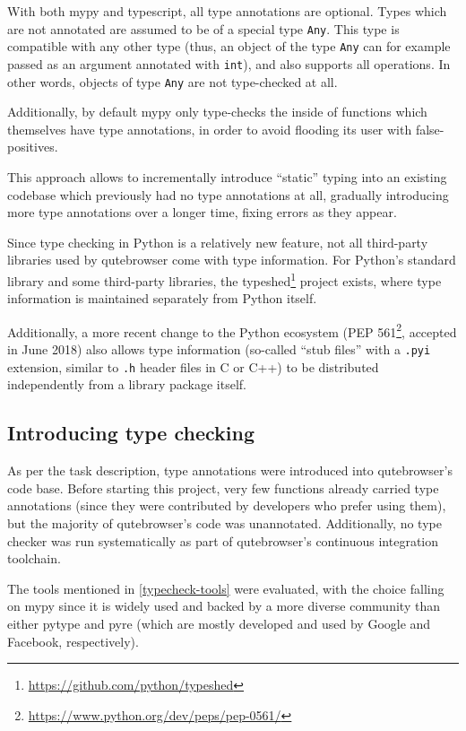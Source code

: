 \documentclass[a4paper,parskip=full]{scrreprt}
\begin{document}
With both mypy and typescript, all type annotations are optional. Types which
are not annotated are assumed to be of a special type \verb|Any|. This type is
compatible with any other type (thus, an object of the type \verb|Any| can for
example passed as an argument annotated with \verb|int|), and also supports all
operations. In other words, objects of type \verb|Any| are not type-checked at
all.

Additionally, by default mypy only type-checks the inside of functions which
themselves have type annotations, in order to avoid flooding its user with
false-positives.

This approach allows to incrementally introduce ``static'' typing into an
existing codebase which previously had no type annotations at all, gradually
introducing more type annotations over a longer time, fixing errors as they
appear.

Since type checking in Python is a relatively new feature, not all third-party
libraries used by qutebrowser come with type information. For Python's standard
library and some third-party libraries, the
typeshed\footnote{\url{https://github.com/python/typeshed}} project exists,
where type information is maintained separately from Python itself.

\label{pep561}
Additionally, a more recent change to the Python ecosystem (PEP
561\footnote{\url{https://www.python.org/dev/peps/pep-0561/}}, accepted in June
2018) also allows type information (so-called ``stub files'' with a \verb|.pyi|
extension, similar to \verb|.h| header files in C or C++) to be distributed
independently from a library package itself.

\subsection{Introducing type checking}
As per the task description, type annotations were introduced into qutebrowser's
code base. Before starting this project, very few functions already carried type
annotations (since they were contributed by developers who prefer using them),
but the majority of qutebrowser's code was unannotated. Additionally, no type
checker was run systematically as part of qutebrowser's continuous integration
toolchain.

The tools mentioned in \ref{typecheck-tools} were evaluated, with the choice
falling on mypy since it is widely used and backed by a more diverse community
than either pytype and pyre (which are mostly developed and used by Google and
Facebook, respectively).
\end{document}
